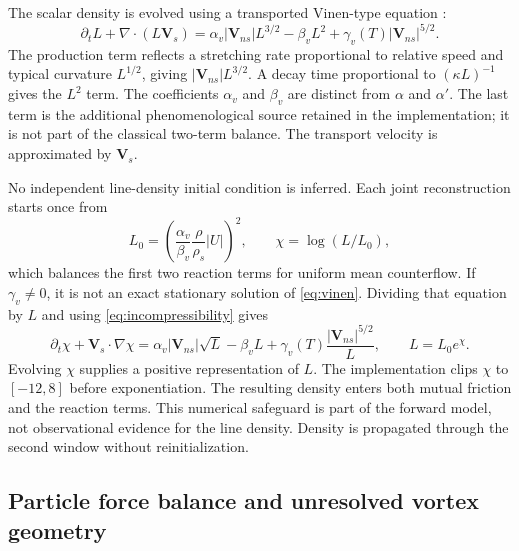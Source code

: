 \documentclass[11pt]{article}
\numberwithin{equation}{section}
\begin{document}
The scalar density is evolved using a transported Vinen-type equation \citep{Vinen1957}:
\begin{equation}
 \partial_tL+\nabla\cdot(L\mathbf V_s)
 =\alpha_v|\mathbf V_{ns}|L^{3/2}-\beta_vL^2
   +\gamma_v(T)|\mathbf V_{ns}|^{5/2}.
 \label{eq:vinen}
\end{equation}
The production term reflects a stretching rate proportional to relative speed and typical curvature $L^{1/2}$, giving $|\mathbf V_{ns}|L^{3/2}$. A decay time proportional to $(\kappa L)^{-1}$ gives the $L^2$ term. The coefficients $\alpha_v$ and $\beta_v$ are distinct from $\alpha$ and $\alpha'$. The last term is the additional phenomenological source retained in the implementation; it is not part of the classical two-term balance. The transport velocity is approximated by $\mathbf V_s$.

No independent line-density initial condition is inferred. Each joint reconstruction starts once from
\begin{equation}
 L_0=\left(\frac{\alpha_v}{\beta_v}
           \frac{\rho}{\rho_s}|U|\right)^2,
 \qquad \chi=\log(L/L_0),
 \label{eq:Linitial}
\end{equation}
which balances the first two reaction terms for uniform mean counterflow. If $\gamma_v\neq0$, it is not an exact stationary solution of \eqref{eq:vinen}. Dividing that equation by $L$ and using \eqref{eq:incompressibility} gives
\begin{equation}
 \partial_t\chi+\mathbf V_s\cdot\nabla\chi
 =\alpha_v|\mathbf V_{ns}|\sqrt L-\beta_vL
   +\gamma_v(T)\frac{|\mathbf V_{ns}|^{5/2}}{L},
 \qquad L=L_0e^\chi.
 \label{eq:logvinen}
\end{equation}
Evolving $\chi$ supplies a positive representation of $L$. The implementation clips $\chi$ to $[-12,8]$ before exponentiation. The resulting density enters both mutual friction and the reaction terms. This numerical safeguard is part of the forward model, not observational evidence for the line density. Density is propagated through the second window without reinitialization.

\subsection{Particle force balance and unresolved vortex geometry}
\label{sec:particlebackground}
\end{document}
